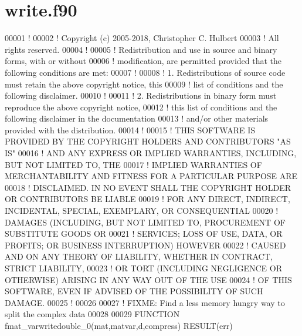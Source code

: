 \hypertarget{write_8f90_source}{}\section{write.\+f90}
\label{write_8f90_source}

\begin{DoxyCode}
00001 \textcolor{comment}{!}
00002 \textcolor{comment}{! Copyright (c) 2005-2018, Christopher C. Hulbert}
00003 \textcolor{comment}{! All rights reserved.}
00004 \textcolor{comment}{!}
00005 \textcolor{comment}{! Redistribution and use in source and binary forms, with or without}
00006 \textcolor{comment}{! modification, are permitted provided that the following conditions are met:}
00007 \textcolor{comment}{!}
00008 \textcolor{comment}{! 1. Redistributions of source code must retain the above copyright notice, this}
00009 \textcolor{comment}{!    list of conditions and the following disclaimer.}
00010 \textcolor{comment}{!}
00011 \textcolor{comment}{! 2. Redistributions in binary form must reproduce the above copyright notice,}
00012 \textcolor{comment}{!    this list of conditions and the following disclaimer in the documentation}
00013 \textcolor{comment}{!    and/or other materials provided with the distribution.}
00014 \textcolor{comment}{!}
00015 \textcolor{comment}{! THIS SOFTWARE IS PROVIDED BY THE COPYRIGHT HOLDERS AND CONTRIBUTORS "AS IS"}
00016 \textcolor{comment}{! AND ANY EXPRESS OR IMPLIED WARRANTIES, INCLUDING, BUT NOT LIMITED TO, THE}
00017 \textcolor{comment}{! IMPLIED WARRANTIES OF MERCHANTABILITY AND FITNESS FOR A PARTICULAR PURPOSE ARE}
00018 \textcolor{comment}{! DISCLAIMED. IN NO EVENT SHALL THE COPYRIGHT HOLDER OR CONTRIBUTORS BE LIABLE}
00019 \textcolor{comment}{! FOR ANY DIRECT, INDIRECT, INCIDENTAL, SPECIAL, EXEMPLARY, OR CONSEQUENTIAL}
00020 \textcolor{comment}{! DAMAGES (INCLUDING, BUT NOT LIMITED TO, PROCUREMENT OF SUBSTITUTE GOODS OR}
00021 \textcolor{comment}{! SERVICES; LOSS OF USE, DATA, OR PROFITS; OR BUSINESS INTERRUPTION) HOWEVER}
00022 \textcolor{comment}{! CAUSED AND ON ANY THEORY OF LIABILITY, WHETHER IN CONTRACT, STRICT LIABILITY,}
00023 \textcolor{comment}{! OR TORT (INCLUDING NEGLIGENCE OR OTHERWISE) ARISING IN ANY WAY OUT OF THE USE}
00024 \textcolor{comment}{! OF THIS SOFTWARE, EVEN IF ADVISED OF THE POSSIBILITY OF SUCH DAMAGE.}
00025 \textcolor{comment}{!}
00026 
00027 \textcolor{comment}{!   FIXME: Find a less memory hungry way to split the complex data}
00028 
00029 \textcolor{keyword}{FUNCTION }fmat\_varwritedouble\_0(mat,matvar,d,compress) \textcolor{keyword}{RESULT}(err)

\end{DoxyCode}
